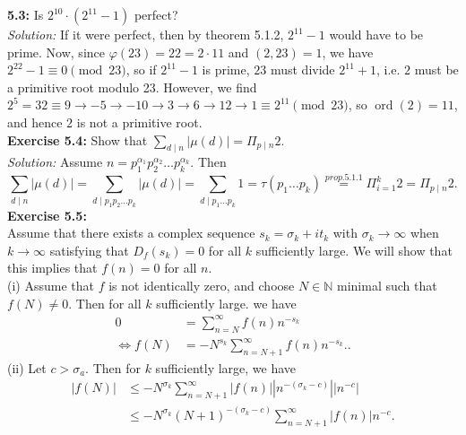 \documentclass[a4paper]{article}
\DeclareMathOperator{\ord}{ord}
\begin{document}
    \textbf{5.3:} Is $2^{10} \cdot \left( 2^{11}-1 \right) $ perfect?\\
    \linebreak
    \textit{Solution:} If it were perfect, then by theorem 5.1.2, 
    $2^{11}-1$ would have to be prime. Now, since $\varphi(23)=22=2 \cdot 11$ 
    and
    $(2,23)=1$, we have $2^{22}-1 \equiv 0 \pmod{23}$, so
    if $2^{11}-1$ is prime, $23$ must divide $2^{11}+1$, i.e. $2$ must be
    a primitive root modulo 23. However, we find
    $2^{5} = 32 \equiv 9 \to -5 \to -10 \to 3 \to 6 \to 12 \to 1 \equiv 2^{11} 
    \pmod {23}$, so $\ord(2) = 11$, and hence $2$ is not a primitive root.\\
    \linebreak
    \textbf{Exercise 5.4:} Show that $\sum_{d \mid n} \left| \mu (d) \right| 
    = \Pi_{p  \mid n}2$.\\
    \linebreak
    \textit{Solution:} Assume $n= p_1^{\alpha_1} p_2^{\alpha_2} \ldots
    p_k^{\alpha_k}$. Then
    \[
    \sum_{d \mid n} \left| \mu (d) \right| 
    = \sum_{d  \mid p_1 p_2 \ldots p_k} \left| \mu(d) \right| 
    = \sum_{d  \mid p_1 \ldots p_k} 1
    = \tau (p_1 \ldots p_k) 
    \stackrel{prop. 5.1.1}{=} \Pi_{i=1}^{k} 2 = \Pi_{p  \mid n} 2
    .\] 
    \textbf{Exercise 5.5:}\\
    Assume that there exists a complex sequence $s_k = \sigma_k + it_k$ with
    $\sigma_k \to \infty$ when $k\to \infty$ satisfying that $D_f (s_k)=0$ for
    all $k$ sufficiently large. We will show that this implies that $f(n)=0$ 
    for all $n$.\\
    \linebreak
    (i) Assume that $f$ is not identically zero, and choose $N \in \mathbb{N}$
    minimal such that $f(N) \neq 0$. Then for all $k$ sufficiently large. we
    have
    \begin{align*}
        0 &= \sum_{n=N}^{\infty} f(n) n^{-s_k}\\
        \iff f(N) &= - N^{s_k} \sum_{n=N+1}^{\infty} f(n)n^{-s_k}.
    .\end{align*}
    (ii) Let $c > \sigma_a$. Then for $k$ sufficiently large, we have
    \begin{align*}
        \left| f(N) \right| 
        &\leq -N^{\sigma_k}  \sum_{n=N+1}^{\infty} \left| f(n)\right| \left|
        n^{-(\sigma_k - c)} \right| \left| n^{-c} \right| \\
        &\le -N^{\sigma_k} \left( N+1 \right)^{-(\sigma_k -c)}
        \sum_{n=N+1}^{\infty} \left| f(n) \right|  n^{-c} 
    .\end{align*}
\end{document}
